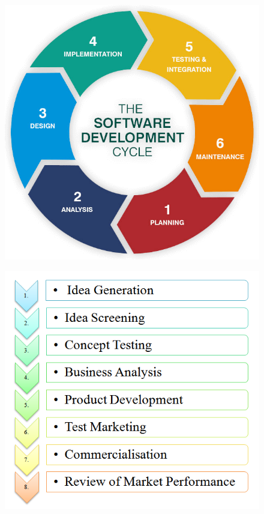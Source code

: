 \documentclass{article}
\begin{document}
\begin{figure}
\centering
\begin{minipage}{.4\textwidth}
  \centering
  \includegraphics[height=.75\linewidth]{software-cycle.png}
  \label{fig:test1}
\end{minipage}%
\hspace{.5cm}
\begin{minipage}{.4\textwidth}
  \centering
  \includegraphics[height=.75\linewidth]{product-cycle.png}
  \label{fig:test2}
\end{minipage}
\end{figure}
\end{document}
